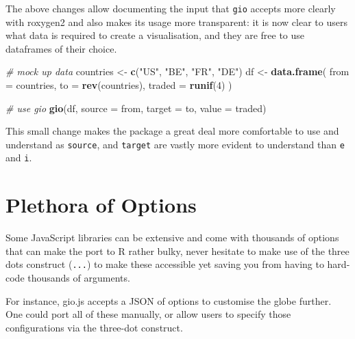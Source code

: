\documentclass[10pt,]{krantz}
\makeatletter
\newenvironment{Shaded}{\begin{snugshade}}{\end{snugshade}}
\newcommand{\CommentTok}[1]{\textcolor[rgb]{0.37,0.37,0.37}{\textit{#1}}}
\newcommand{\DataTypeTok}[1]{\textcolor[rgb]{0.27,0.27,0.27}{#1}}
\newcommand{\DecValTok}[1]{\textcolor[rgb]{0.06,0.06,0.06}{#1}}
\newcommand{\KeywordTok}[1]{\textcolor[rgb]{0.27,0.27,0.27}{\textbf{#1}}}
\newcommand{\NormalTok}[1]{#1}
\newcommand{\StringTok}[1]{\textcolor[rgb]{0.5,0.5,0.5}{#1}}
\newenvironment{kframe}{%
\medskip{}
\setlength{\fboxsep}{.8em}
 \def\at@end@of@kframe{}%
 \ifinner\ifhmode%
  \def\at@end@of@kframe{\end{minipage}}%
  \begin{minipage}{\columnwidth}%
 \fi\fi%
 \def\FrameCommand##1{\hskip\@totalleftmargin \hskip-\fboxsep
 \colorbox{shadecolor}{##1}\hskip-\fboxsep
     \hskip-\linewidth \hskip-\@totalleftmargin \hskip\columnwidth}%
 \MakeFramed {\advance\hsize-\width
   \@totalleftmargin\z@ \linewidth\hsize
   \@setminipage}}%
 {\par\unskip\endMakeFramed%
 \at@end@of@kframe}
\renewenvironment{Shaded}{\begin{kframe}}{\end{kframe}}
\makeatother
\begin{document}
The above changes allow documenting the input that \texttt{gio} accepts more clearly with roxygen2 and also makes its usage more transparent: it is now clear to users what data is required to create a visualisation, and they are free to use dataframes of their choice.

\begin{Shaded}
\begin{Highlighting}[]
\CommentTok{# mock up data}
\NormalTok{countries <-}\StringTok{ }\KeywordTok{c}\NormalTok{(}\StringTok{"US"}\NormalTok{, }\StringTok{"BE"}\NormalTok{, }\StringTok{"FR"}\NormalTok{, }\StringTok{"DE"}\NormalTok{)}
\NormalTok{df <-}\StringTok{ }\KeywordTok{data.frame}\NormalTok{(}
  \DataTypeTok{from =}\NormalTok{ countries,}
  \DataTypeTok{to =} \KeywordTok{rev}\NormalTok{(countries),}
  \DataTypeTok{traded =} \KeywordTok{runif}\NormalTok{(}\DecValTok{4}\NormalTok{)}
\NormalTok{)}

\CommentTok{# use gio}
\KeywordTok{gio}\NormalTok{(df, }\DataTypeTok{source =}\NormalTok{ from, }\DataTypeTok{target =}\NormalTok{ to, }\DataTypeTok{value =}\NormalTok{ traded)}
\end{Highlighting}
\end{Shaded}

This small change makes the package a great deal more comfortable to use and understand as \texttt{source}, and \texttt{target} are vastly more evident to understand than \texttt{e} and \texttt{i}.

\hypertarget{widgets-final-options}{%
\section{Plethora of Options}\label{widgets-final-options}}

Some JavaScript libraries can be extensive and come with thousands of options that can make the port to R rather bulky, never hesitate to make use of the three dots construct (\texttt{...}) to make these accessible yet saving you from having to hard-code thousands of arguments.

For instance, gio.js accepts a JSON of options to customise the globe further. One could port all of these manually, or allow users to specify those configurations via the three-dot construct.
\end{document}
